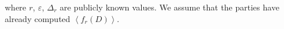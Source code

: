       where $r$, $\varepsilon$, $\Delta _r$ are publicly known values. We assume that the parties have already computed $\left\langle {f_r\left(D\right)}\right\rangle$.






